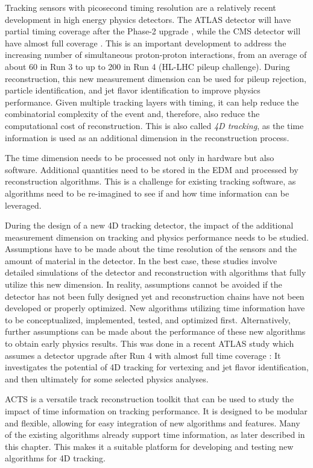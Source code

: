 Tracking sensors with picosecond timing resolution are a relatively recent development in high energy physics detectors. The ATLAS detector will have partial timing coverage after the Phase-2 upgrade \cite{hgtd-tdr}, while the CMS detector will have almost full coverage \cite{cms-mtd-tdr}. This is an important development to address the increasing number of simultaneous proton-proton interactions, from an average of about 60 in Run 3 to up to 200 in Run 4 (HL-LHC pileup challenge). During reconstruction, this new measurement dimension can be used for pileup rejection, particle identification, and jet flavor identification to improve physics performance. Given multiple tracking layers with timing, it can help reduce the combinatorial complexity of the event and, therefore, also reduce the computational cost of reconstruction. This is also called \textit{4D tracking}, as the time information is used as an additional dimension in the reconstruction process.

The time dimension needs to be processed not only in hardware but also software. Additional quantities need to be stored in the EDM and processed by reconstruction algorithms. This is a challenge for existing tracking software, as algorithms need to be re-imagined to see if and how time information can be leveraged.

During the design of a new 4D tracking detector, the impact of the additional measurement dimension on tracking and physics performance needs to be studied. Assumptions have to be made about the time resolution of the sensors and the amount of material in the detector. In the best case, these studies involve detailed simulations of the detector and reconstruction with algorithms that fully utilize this new dimension. In reality, assumptions cannot be avoided if the detector has not been fully designed yet and reconstruction chains have not been developed or properly optimized. New algorithms utilizing time information have to be conceptualized, implemented, tested, and optimized first. Alternatively, further assumptions can be made about the performance of these new algorithms to obtain early physics results. This was done in a recent ATLAS study which assumes a detector upgrade after Run 4 with almost full time coverage \cite{pub-2023-023}: It investigates the potential of 4D tracking for vertexing and jet flavor identification, and then ultimately for some selected physics analyses.

ACTS is a versatile track reconstruction toolkit that can be used to study the impact of time information on tracking performance. It is designed to be modular and flexible, allowing for easy integration of new algorithms and features. Many of the existing algorithms already support time information, as later described in this chapter. This makes it a suitable platform for developing and testing new algorithms for 4D tracking.

